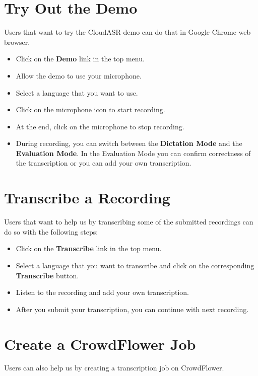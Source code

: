 \section{Try Out the Demo}
    Users that want to try the CloudASR demo can do that in Google Chrome web browser.

    \begin{itemize}
	\item Click on the \textbf{Demo} link in the top menu.
	\item Allow the demo to use your microphone.
	\item Select a language that you want to use.
	\item Click on the microphone icon to start recording.
	\item At the end, click on the microphone to stop recording.
	\item
	    During recording, you can switch between the \textbf{Dictation Mode} and the \textbf{Evaluation Mode}.
	    In the Evaluation Mode you can confirm correctness of the transcription or you can add your own transcription.
    \end{itemize}


\section{Transcribe a Recording}
    Users that want to help us by transcribing some of the submitted recordings can do so with the following steps:

    \begin{itemize}
	\item Click on the \textbf{Transcribe} link in the top menu.
	\item Select a language that you want to transcribe and click on the corresponding \textbf{Transcribe} button.
	\item Listen to the recording and add your own transcription.
	\item After you submit your transcription, you can continue with next recording.
    \end{itemize}

\section{Create a CrowdFlower Job}
    Users can also help us by creating a transcription job on CrowdFlower.

